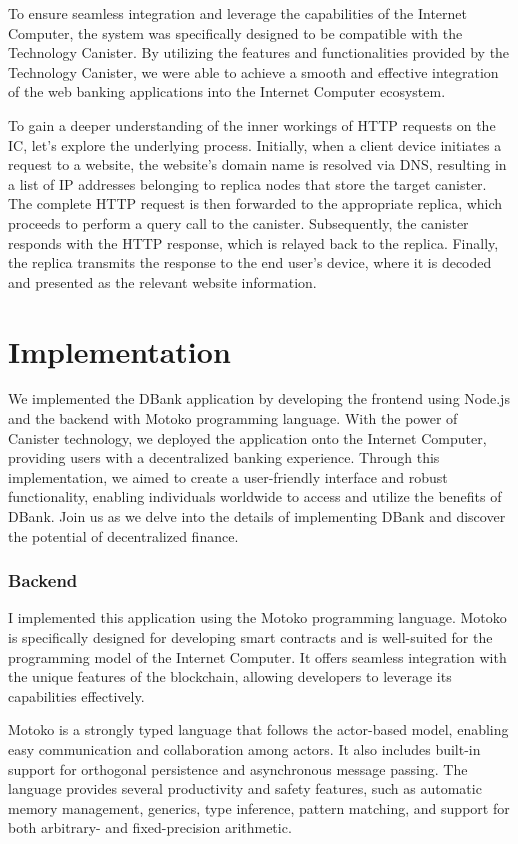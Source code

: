 To ensure seamless integration and leverage the capabilities of the Internet Computer, the system was specifically designed to be compatible with the Technology Canister. By utilizing the features and functionalities provided by the Technology Canister, we were able to achieve a smooth and effective integration of the web banking applications into the Internet Computer ecosystem.

To gain a deeper understanding of the inner workings of \ac{HTTP} requests on the \ac{IC}, let's explore the underlying process. Initially, when a client device initiates a request to a website, the website's domain name is resolved via \ac{DNS}, resulting in a list of \ac{IP} addresses belonging to replica nodes that store the target canister. The complete \ac{HTTP} request is then forwarded to the appropriate replica, which proceeds to perform a query call to the canister. Subsequently, the canister responds with the \ac{HTTP} response, which is relayed back to the replica. Finally, the replica transmits the response to the end user's device, where it is decoded and presented as the relevant website information.

\section{Implementation}
We implemented the DBank application by developing the frontend using Node.js and the backend with Motoko programming language. With the power of Canister technology, we deployed the application onto the Internet Computer, providing users with a decentralized banking experience. Through this implementation, we aimed to create a user-friendly interface and robust functionality, enabling individuals worldwide to access and utilize the benefits of DBank. Join us as we delve into the details of implementing DBank and discover the potential of decentralized finance.
\subsubsection{Backend}
I implemented this application using the Motoko programming language. Motoko is specifically designed for developing smart contracts and is well-suited for the programming model of the Internet Computer. It offers seamless integration with the unique features of the blockchain, allowing developers to leverage its capabilities effectively.

Motoko is a strongly typed language that follows the actor-based model, enabling easy communication and collaboration among actors. It also includes built-in support for orthogonal persistence and asynchronous message passing. The language provides several productivity and safety features, such as automatic memory management, generics, type inference, pattern matching, and support for both arbitrary- and fixed-precision arithmetic.

